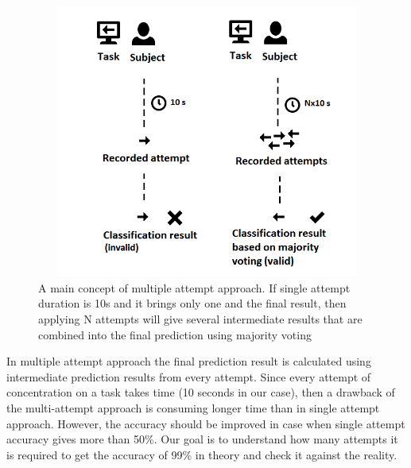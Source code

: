 \documentclass[12pt]{article}
\theoremstyle{definition}
\begin{document}
\begin{figure} [H]
\begin{center}
\includegraphics[height=9cm, width=1\textwidth]{main}
\caption{A main concept of multiple attempt approach. If single attempt duration is 10s and it brings only one and the final result, then applying N attempts will give several intermediate results that are combined into the final prediction using majority voting}
\label{fig:condorcet}
\end{center}
\end{figure}

In multiple attempt approach the final prediction result is calculated using intermediate prediction results from every attempt. Since every attempt of concentration on a task takes time (10 seconds in our case), then a drawback of the multi-attempt approach is consuming longer time than in single attempt approach. However, the accuracy should be improved in case when single attempt accuracy gives more than 50\%. Our goal is to understand how many attempts it is required to get the accuracy of 99\% in theory and check it against the reality.
\end{document}
